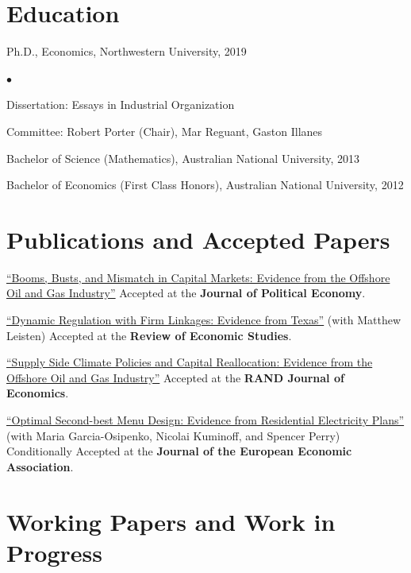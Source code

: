 \documentclass[margin,line]{res}
\newenvironment{list1}{
  \begin{list}{\ding{113}}{%
      \setlength{\itemsep}{.025in}
      \setlength{\parsep}{0in} \setlength{\parskip}{0in}
      \setlength{\topsep}{0in} \setlength{\partopsep}{0in}
      \setlength{\leftmargin}{0.17in}}}{\end{list}}
\newenvironment{list2}{
  \begin{list}{$\bullet$}{%
      \setlength{\itemsep}{0in}
      \setlength{\parsep}{0in} \setlength{\parskip}{0in}
      \setlength{\topsep}{0in} \setlength{\partopsep}{0in}
      \setlength{\leftmargin}{0.2in}}}{\end{list}}
\begin{document}
\begin{resume}
\section{ Education}\begin{tiny}

\end{tiny}
\begin{list1}
\item[] Ph.D., Economics, Northwestern University, 2019
	\begin{list2}
		\item[] Dissertation: Essays in Industrial Organization
		\item[] Committee: Robert Porter (Chair), Mar Reguant, Gaston Illanes
	\end{list2}
\item[] Bachelor of Science (Mathematics), Australian National University, 2013
\item[] Bachelor of Economics (First Class Honors), Australian National University, 2012
\end{list1}

\section{Publications and Accepted Papers}
\begin{list1}
\item[] \href{https://nvreug.github.io/paper/bbm.pdf}{``Booms, Busts, and Mismatch in Capital Markets: Evidence from the Offshore Oil and Gas Industry''} Accepted at the \textbf{Journal of Political Economy}.
\item[] \href{https://nvreug.github.io/paper/dynamic_regulation_published.pdf}{``Dynamic Regulation with Firm Linkages: Evidence from Texas''} (with Matthew Leisten) Accepted at the \textbf{Review of Economic Studies}.
\item[] \href{https://nvreug.github.io/paper/oil_incomplete.pdf}{``Supply Side Climate Policies and Capital Reallocation:
Evidence from the Offshore Oil and Gas Industry''} Accepted at the \textbf{RAND Journal of Economics}.
\item[] \href{https://nvreug.github.io/paper/gkpv.pdf}{``Optimal Second-best Menu Design: Evidence from Residential Electricity Plans''} (with Maria Garcia-Osipenko, Nicolai Kuminoff, and Spencer Perry) Conditionally Accepted at the \textbf{Journal of the European Economic Association}.
\end{list1}

\section{Working Papers and Work in Progress}
\begin{list1}


\end{list1}
\end{resume}
\end{document}

